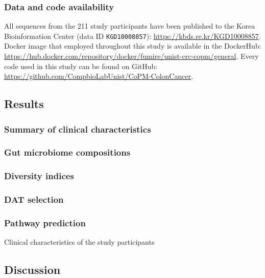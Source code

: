 \documentclass[11pt, a4paper, onecolumn, oneside]{report}
\begin{document}
            \subsubsection{Data and code availability}
                All sequences from the 211 study participants have been published to the Korea Bioinformation Center (data ID \texttt{KGD10008857}): \url{https://kbds.re.kr/KGD10008857}.
                Docker image that employed throughout this study is available in the DockerHub: \url{https://hub.docker.com/repository/docker/fumire/unist-crc-copm/general}. Every code used in this study can be found on GitHub: \url{https://github.com/CompbioLabUnist/CoPM-ColonCancer}.
        \clearpage

        \subsection{Results}
            \subsubsection{Summary of clinical characteristics}
            \subsubsection{Gut microbiome compositions}
            \subsubsection{Diversity indices}
            \subsubsection{DAT selection}
            \subsubsection{Pathway prediction}

            \begin{table}[p]
                \caption{Clinical characteristics of the study participants}
                \label{tab:CRC-clinical}
            \end{table}
            \clearpage
        \clearpage

        \subsection{Discussion}
        \clearpage
    \newpage
\end{document}
